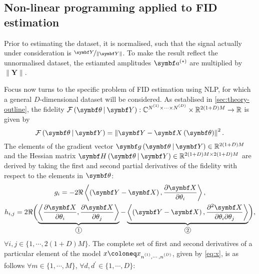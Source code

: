 \subsection{Non-linear programming applied to FID estimation}
\begin{remark}
    \label{rem:norm-data}
    Prior to estimating the dataset, it is normalised, such that the signal
    actually under consideration is $\nicefrac{\bY}{\lVert \bY \rVert}$.
    To make the result reflect the unnormalised dataset, the estiamted
    amplitudes $\bdastar$ are multiplied by $\lVert \symbf{Y} \rVert$.
\end{remark}
Focus now turns to the specific problem of FID estimation using \ac{NLP}, for
which a general $D$-dimensional dataset will be considered. As establised in
\cref{sec:theory-outline}, the fidelity $\FthY : \mathbb{C}^{\None \times
\cdots \times \ND} \times \mathbb{R}^{2(1 + D)M} \rightarrow \mathbb{R}$ is
given by
\begin{equation}
    \FthY = \left \lVert \bY - \bXth \right \rVert^2.
    \label{eq:fidelity}
\end{equation}
The elements of the gradient vector $\bdgthY \in \mathbb{R}^{2(1+D)M}$ and
the Hessian matrix $\bdHthY \in \mathbb{R}^{2(1+D)M \times 2(1+D)M}$ are
derived by taking the first and second partial derivatives of the fidelity with
respect to the elements in $\bth$:
\begin{subequations}
    \begin{gather}
        g_i = -2 \Re
                \left\langle
                    \left(\bY - \bX\right),
                    \frac{\partial \bX}{\partial \theta_i}
                \right\rangle,
        \label{eq:grad} \\
        h_{i,j} = 2 \Re
            \biggl(
                \underbrace{
                    \left\langle
                        \frac{\partial \bX}{\partial \theta_i},
                        \frac{\partial \bX}{\partial \theta_j}
                    \right\rangle
                }_{\circled{1}}
                -
                \underbrace{
                    \left\langle
                        \left(\bY - \bX\right),
                        \frac{\partial^2 \bX}{\partial \theta_i \partial \theta_j}
                    \right\rangle
                }_{\circled{2}}
            \biggl),
            \label{eq:hess}
    \end{gather}
    \label{eq:fidelity-grad-hess}%
\end{subequations}
$\forall i,j \in \lbrace 1, \cdots, 2(1+D)M \rbrace$.
The complete set of first and second derivatives of a particular element of the
model $x \coloneq \xnonenD$, given by \cref{eq:x}, is as follows
$\forall m \in \lbrace 1, \cdots, M \rbrace$,
$\forall d, d^{\prime} \in \lbrace 1, \cdots, D \rbrace$:
